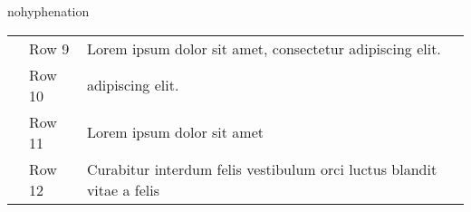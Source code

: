 \begin{hyphenrules}{nohyphenation}
\begin{table}[H]
\begin{tabular}{ @{} >{\raggedright\arraybackslash}p{2.5cm} >{\raggedright\arraybackslash}p{3cm} >{\raggedright\arraybackslash}p{4cm} >{\raggedleft\arraybackslash}p{3cm} @{} }
            & Row 9 & Lorem ipsum dolor sit amet, consectetur adipiscing elit. & \cite{Geurs2004} \\
            & Row 10 & adipiscing elit. & \cite{Geurs2004} \\
            & Row 11 & Lorem ipsum dolor sit amet \cite{Geurs2004} \\
            & Row 12 & Curabitur interdum felis vestibulum orci luctus blandit vitae a felis & \cite{Geurs2004} \\
            \bottomrule
        \end{tabular}
    \end{table} 
\end{hyphenrules}